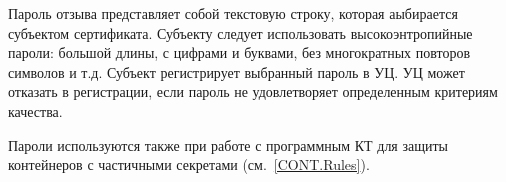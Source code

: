 Пароль отзыва представляет собой текстовую строку, которая аыбирается 
субъектом сертификата. Субъекту следует использовать  
высокоэнтропийные пароли: большой длины, с цифрами и буквами, 
без многократных повторов символов и т.д.
%
Субъект регистрирует выбранный пароль в УЦ. УЦ может отказать в регистрации, 
если пароль не удовлетворяет определенным критериям качества. 

Пароли используются также при работе с программным КТ для защиты 
контейнеров с частичными секретами (см.~\ref{CONT.Rules}).

